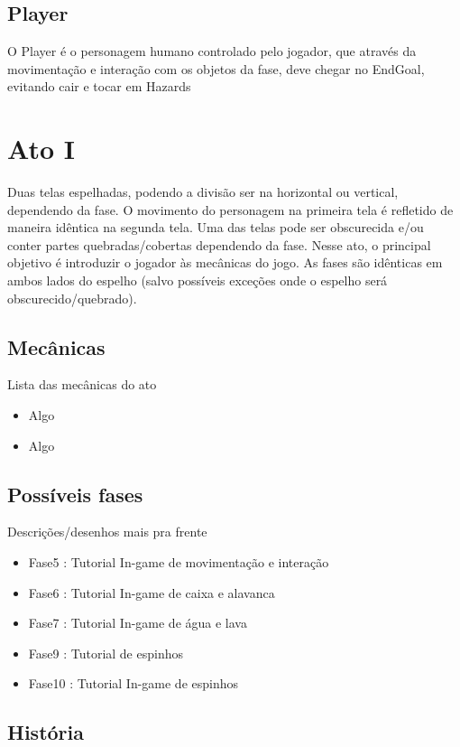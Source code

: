 \documentclass[a4paper, 11pt]{article}
\begin{document}
		\subsection{Player}
			O Player é o personagem humano controlado pelo jogador, que através da movimentação e interação com os objetos da fase, deve chegar no EndGoal, evitando cair e  tocar em Hazards

 
 
\section{Ato I} 
 
	Duas telas espelhadas, podendo a divisão ser na horizontal ou vertical, dependendo da fase. O movimento do 
	personagem na primeira tela é refletido de maneira idêntica na segunda tela. Uma das telas pode ser obscurecida 
	e/ou conter partes quebradas/cobertas dependendo da fase. 
	Nesse ato, o principal objetivo é introduzir o jogador às mecânicas do jogo. As fases são idênticas 
	em ambos lados do espelho (salvo possíveis exceções onde o espelho será obscurecido/quebrado). 
 
\subsection{Mecânicas} 
 
	Lista das mecânicas do ato 
	\begin{itemize} 
		\item Algo 
		\item Algo 
	\end{itemize} 
 
\subsection{Possíveis fases} 
 
	Descrições/desenhos mais pra frente 
	\begin{itemize} 
		\item Fase5 : Tutorial In-game de movimentação e interação 
		\item Fase6 : Tutorial In-game de caixa e alavanca
		\item Fase7 : Tutorial In-game de água e lava
		\item Fase9 : Tutorial de espinhos
		\item Fase10 : Tutorial In-game de espinhos
	\end{itemize} 
 
\subsection{História} 
 
\end{document}
